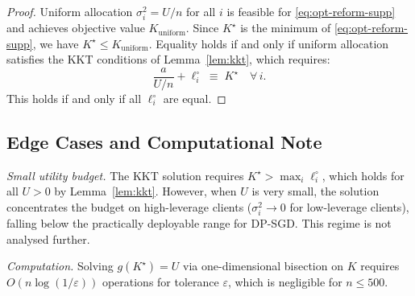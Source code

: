 \documentclass[letterpaper,journal]{IEEEtran}
\begin{document}
\begin{proof}
Uniform allocation $\sigma_i^2 = U/n$ for all $i$ is feasible
for \eqref{eq:opt-reform-supp} and achieves objective value
$K_{\mathrm{uniform}}$. Since $K^\star$ is the minimum of
\eqref{eq:opt-reform-supp}, we have $K^\star \leq
K_{\mathrm{uniform}}$. Equality holds if and only if uniform allocation satisfies the
KKT conditions of Lemma~\ref{lem:kkt}, which requires:
\[
\frac{a}{U/n} + \ell_i^\circ \;\equiv\; K^\star
\quad \forall\, i.
\]
This holds if and only if all $\ell_i^\circ$ are equal.
\end{proof}

\subsection{Edge Cases and Computational Note}

\noindent\textit{Small utility budget.} The KKT solution
requires $K^\star > \max_i \ell_i^\circ$, which holds for all
$U > 0$ by Lemma~\ref{lem:kkt}. However, when $U$ is very
small, the solution concentrates the budget on high-leverage
clients ($\sigma_i^2 \to 0$ for low-leverage clients), falling
below the practically deployable range for DP-SGD. This regime
is not analysed further.

\medskip
\noindent\textit{Computation.} Solving $g(K^\star) = U$ via
one-dimensional bisection on $K$ requires
$O(n \log(1/\varepsilon))$ operations for tolerance
$\varepsilon$, which is negligible for $n \leq 500$.



\end{document}
